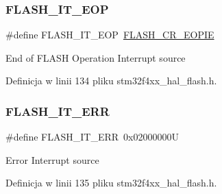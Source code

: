 \subsubsection{\texorpdfstring{F\+L\+A\+S\+H\+\_\+\+I\+T\+\_\+\+E\+OP}{FLASH\_IT\_EOP}}
{\footnotesize\ttfamily \#define F\+L\+A\+S\+H\+\_\+\+I\+T\+\_\+\+E\+OP~\hyperlink{group___peripheral___registers___bits___definition_gab9e69856f654ec430a42791a34799db0}{F\+L\+A\+S\+H\+\_\+\+C\+R\+\_\+\+E\+O\+P\+IE}}

End of F\+L\+A\+SH Operation Interrupt source 

Definicja w linii 134 pliku stm32f4xx\+\_\+hal\+\_\+flash.\+h.

\mbox{\label{group___f_l_a_s_h___interrupt__definition_ga4e2c23ab8c1b9a5ee49bf6d695d9ae8c}} 
\subsubsection{\texorpdfstring{F\+L\+A\+S\+H\+\_\+\+I\+T\+\_\+\+E\+RR}{FLASH\_IT\_ERR}}
{\footnotesize\ttfamily \#define F\+L\+A\+S\+H\+\_\+\+I\+T\+\_\+\+E\+RR~0x02000000U}

Error Interrupt source 

Definicja w linii 135 pliku stm32f4xx\+\_\+hal\+\_\+flash.\+h.

